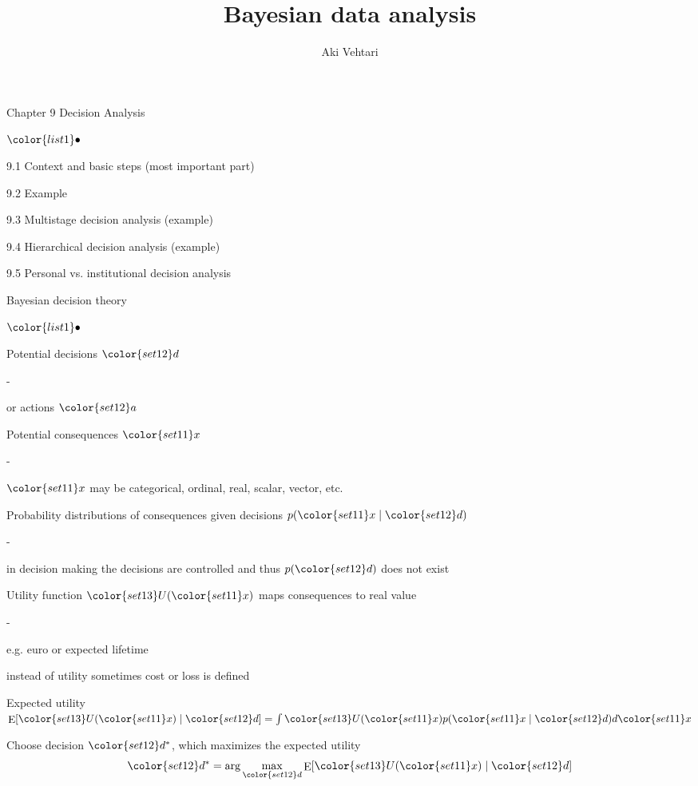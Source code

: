 \documentclass[t]{beamer}
\title[]{Bayesian data analysis}
\subtitle{}
\author{Aki Vehtari}
\institute[Aalto]{}
\date[]{}
\newenvironment{list1}{
   \begin{list}{$\color{list1}\bullet$}{\itemsep=6pt}}{
  \end{list}}
\newenvironment{list2}{
  \begin{list}{-}{\baselineskip=12pt\itemsep=2pt}}{
  \end{list}}
\DeclareMathOperator{\E}{E}
\begin{document}
\begin{frame}{Chapter 9 Decision Analysis}

  \begin{list1}
\item 9.1 Context and basic steps (most important part)
\item 9.2 Example
\item 9.3 Multistage decision analysis (example)
\item 9.4 Hierarchical decision analysis (example)
\item 9.5 Personal vs. institutional decision analysis
\end{list1}
\end{frame}

\begin{frame}{Bayesian decision theory}

  \begin{list1}
  \item<+-> Potential decisions ${\color{set12}d}$
    \begin{list2}
      \item or actions ${\color{set12}a}$
    \end{list2}
  \item<+-> Potential consequences ${\color{set11}x}$
    \begin{list2}
      \item ${\color{set11}x}$ may be categorical, ordinal, real, scalar, vector, etc.
    \end{list2}
  \item<+-> Probability distributions of consequences given decisions $p({\color{set11}x}\mid{\color{set12}d})$
    \begin{list2}
    \item in decision making the decisions are controlled and thus $p({\color{set12}d})$ does not exist
    \end{list2}
  \item<+->  Utility function ${\color{set13}U}({\color{set11}x})$ maps consequences to real value
    \begin{list2}
      \item e.g. euro or expected lifetime
      \item instead of utility sometimes cost or loss is defined
    \end{list2}
    \vspace{-1mm}
  \item<+-> Expected utility  $\E[{\color{set13}U}({\color{set11}x})\mid{\color{set12}d}]=\int {\color{set13}U}({\color{set11}x}) p({\color{set11}x}\mid{\color{set12}d}) d{\color{set11}x}$
  \item<+-> Choose decision ${\color{set12}d^*}$, which maximizes the expected utility
    \begin{equation*}
      {\color{set12}d^*}=\arg\max_{\color{set12}d} \E[{\color{set13}U}({\color{set11}x})\mid{\color{set12}d}]
    \end{equation*}
  \end{list1}

\end{frame}
\end{document}
